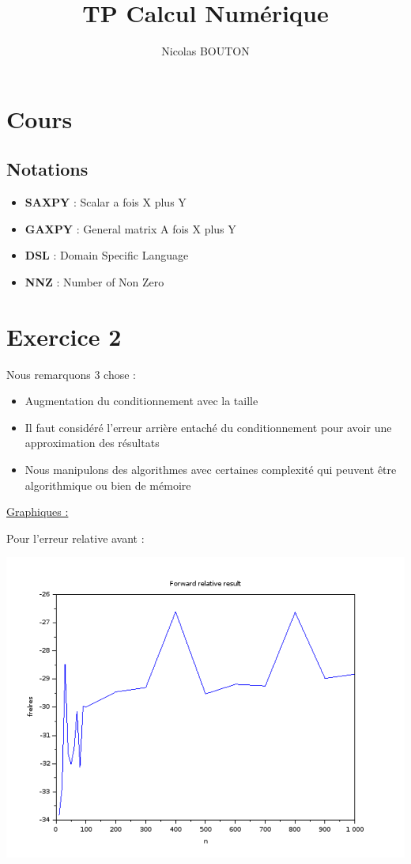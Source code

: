 \documentclass{article}
\title{TP Calcul Numérique}
\author{Nicolas BOUTON}
\begin{document}
\maketitle

\section*{Cours}

\subsection*{Notations}

\begin{itemize}
\item \textbf{SAXPY} : Scalar a fois X plus Y
\item \textbf{GAXPY} : General matrix A fois X plus Y
\item \textbf{DSL} : Domain Specific Language
\item \textbf{NNZ} : Number of Non Zero
\end{itemize}

\section*{Exercice 2}

Nous remarquons 3 chose :

\begin{itemize}
\item Augmentation du conditionnement avec la taille
\item Il faut considéré l'erreur arrière entaché du conditionnement
  pour avoir une approximation des résultats
\item Nous manipulons des algorithmes avec certaines complexité qui
  peuvent être algorithmique ou bien de mémoire
\end{itemize}

\underline{Graphiques :} \newline

Pour l'erreur relative avant :

\includegraphics[scale=0.5]{img/frelres.png}
\end{document}
